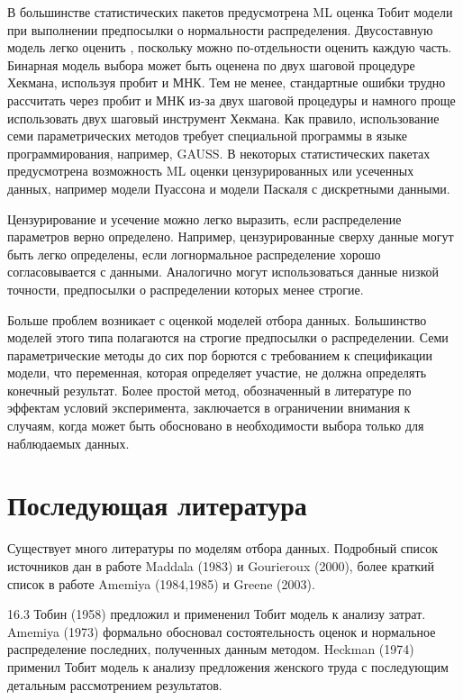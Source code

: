 В большинстве статистических пакетов предусмотрена ML оценка Тобит модели при выполнении предпосылки о нормальности распределения. Двусоставную модель легко оценить , поскольку можно по-отдельности оценить каждую часть. Бинарная модель выбора может быть оценена по двух шаговой процедуре Хекмана, используя пробит и МНК. Тем не менее, стандартные ошибки трудно рассчитать через пробит и МНК из-за двух шаговой процедуры и намного проще использовать двух шаговый инструмент Хекмана. Как правило, использование семи параметрических методов требует специальной программы в языке программирования, например, GAUSS. В некоторых статистических пакетах предусмотрена возможность ML оценки цензурированных или усеченных данных, например модели Пуассона и модели Паскаля с дискретными данными.

Цензурирование и усечение можно легко выразить, если распределение параметров верно определено. Например, цензурированные сверху данные могут быть легко определены, если логнормальное распределение хорошо согласовывается с данными. Аналогично могут использоваться данные низкой точности, предпосылки о распределении которых менее строгие. 

Больше проблем возникает с оценкой моделей отбора данных. Большинство моделей этого типа полагаются на строгие предпосылки о распределении. Семи параметрические методы до сих пор борются с требованием к спецификации модели, что переменная, которая определяет участие, не должна определять конечный результат. Более простой метод, обозначенный в литературе по эффектам условий эксперимента, заключается в ограничении внимания к случаям, когда может быть обосновано в необходимости выбора только для наблюдаемых данных.

\section{Последующая литература}

Существует много литературы по моделям отбора данных. Подробный список источников дан в работе Maddala (1983) и Gourieroux (2000), более краткий список в работе Amemiya (1984,1985) и Greene (2003). 

16.3 Тобин (1958) предложил и примененил Тобит модель к анализу затрат. Amemiya (1973) формально обосновал состоятельность оценок и нормальное распределение последних, полученных данным методом. Heckman (1974) применил Тобит модель к анализу предложения женского труда с последующим детальным рассмотрением результатов.

